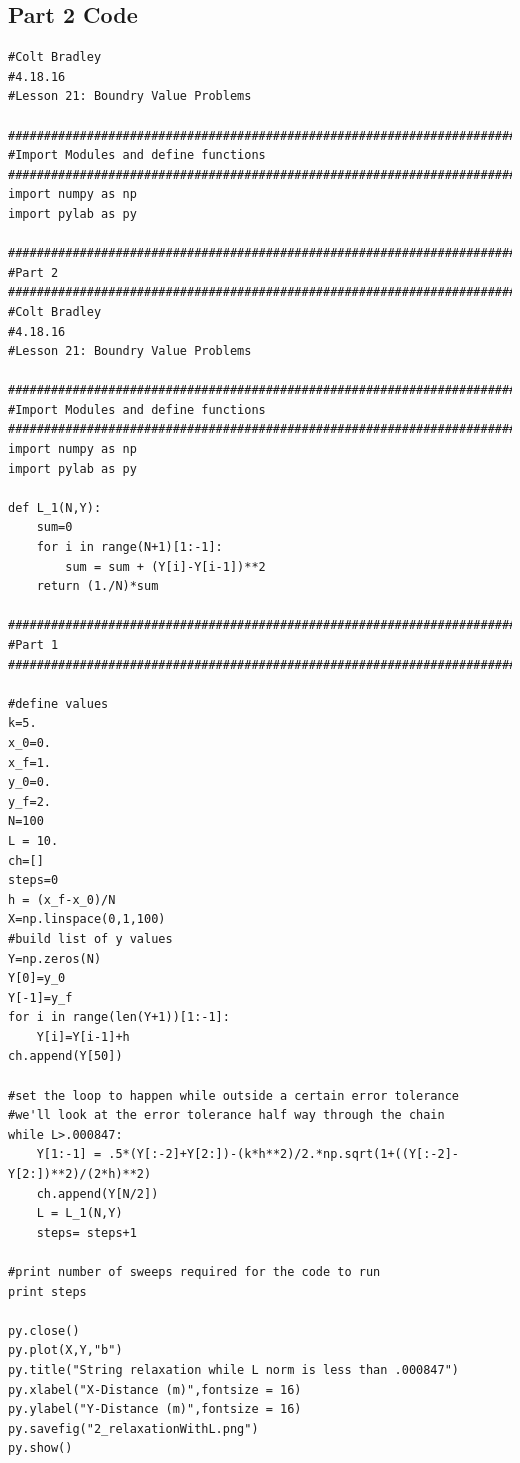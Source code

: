 \documentclass[11pt]{article}
\begin{document}
\subsection{Part 2 Code}
\begin{verbatim}
#Colt Bradley
#4.18.16
#Lesson 21: Boundry Value Problems

###############################################################################
#Import Modules and define functions
###############################################################################
import numpy as np
import pylab as py

###############################################################################
#Part 2
###############################################################################
#Colt Bradley
#4.18.16
#Lesson 21: Boundry Value Problems

###############################################################################
#Import Modules and define functions
###############################################################################
import numpy as np
import pylab as py

def L_1(N,Y):
    sum=0
    for i in range(N+1)[1:-1]:
        sum = sum + (Y[i]-Y[i-1])**2
    return (1./N)*sum

###############################################################################
#Part 1
###############################################################################

#define values
k=5.
x_0=0.
x_f=1.
y_0=0.
y_f=2.
N=100
L = 10.
ch=[]
steps=0
h = (x_f-x_0)/N
X=np.linspace(0,1,100)
#build list of y values
Y=np.zeros(N)
Y[0]=y_0
Y[-1]=y_f
for i in range(len(Y+1))[1:-1]:
    Y[i]=Y[i-1]+h
ch.append(Y[50])

#set the loop to happen while outside a certain error tolerance
#we'll look at the error tolerance half way through the chain
while L>.000847:    
    Y[1:-1] = .5*(Y[:-2]+Y[2:])-(k*h**2)/2.*np.sqrt(1+((Y[:-2]-Y[2:])**2)/(2*h)**2)
    ch.append(Y[N/2])
    L = L_1(N,Y)
    steps= steps+1

#print number of sweeps required for the code to run
print steps

py.close()
py.plot(X,Y,"b")
py.title("String relaxation while L norm is less than .000847")
py.xlabel("X-Distance (m)",fontsize = 16)
py.ylabel("Y-Distance (m)",fontsize = 16)
py.savefig("2_relaxationWithL.png")
py.show()
\end{verbatim}
\end{document}
